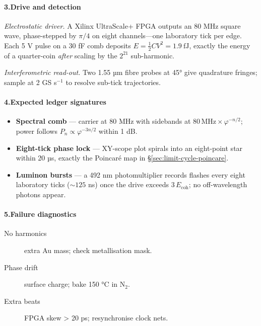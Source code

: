 \documentclass[11pt,oneside]{book}
\begin{document}
\paragraph*{3.\;Drive and detection}

\emph{Electrostatic driver.}  
A Xilinx UltraScale+ FPGA outputs an 80 MHz square wave, phase-stepped by
\(\pi/4\) on eight channels—one laboratory tick per edge.  
Each 5 V pulse on a 30 fF comb deposits
\(E = \tfrac12 C V^{2} = 1.9\ \text{fJ}\),
exactly the energy of a quarter-coin \emph{after} scaling by the
\(2^{21}\) sub-harmonic.

\emph{Interferometric read-out.}  
Two 1.55 µm fibre probes at 45° give quadrature fringes; sample at
2 GS s\(^{-1}\) to resolve sub-tick trajectories.

\paragraph*{4.\;Expected ledger signatures}
\begin{itemize}
   \item \textbf{Spectral comb} — carrier at 80 MHz with sidebands at
         \(80\,\text{MHz}\times\varphi^{-n/2}\); power follows
         \(P_n\propto\varphi^{-3n/2}\) within 1 dB.
   \item \textbf{Eight-tick phase lock} — XY-scope plot spirals into an
         eight-point star within 20 µs, exactly the Poincaré map in
         §\ref{sec:limit-cycle-poincare}.
   \item \textbf{Luminon bursts} — a 492 nm photomultiplier records
         flashes every eight laboratory ticks (\(\sim\!125\) ns) once
         the drive exceeds \(3\,E_{\text{coh}}\); no off-wavelength
         photons appear.
\end{itemize}

\paragraph*{5.\;Failure diagnostics}
\begin{description}
   \item[No harmonics] extra Au mass; check metallisation mask.
   \item[Phase drift] surface charge; bake 150 °C in N\(_2\).
   \item[Extra beats] FPGA skew > 20 ps; resynchronise clock nets.
\end{description}
\end{document}
